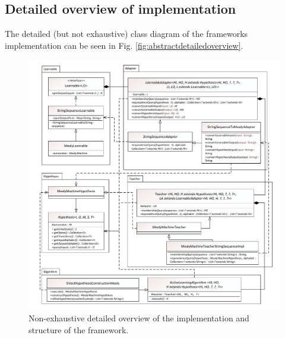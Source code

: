 \subsection{Detailed overview of implementation}

The detailed (but not exhaustive) class diagram of the frameworks implementation can be seen in Fig. \ref{fig:abstractdetailedoverview}.

\begin{figure}[H]
	\centering
	\includegraphics[width=1.0\linewidth]{figures/implementationdetailedoverview}
	\caption{Non-exhaustive detailed overview of the implementation and structure of the framework.}
	\label{fig:impldetailedoverview}
\end{figure}
